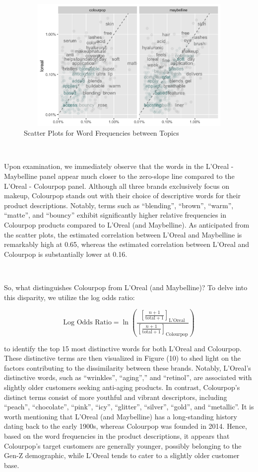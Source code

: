 \documentclass[10pt]{article}
\begin{document}
\begin{figure}[ht!]
    \centering
    \hspace*{-4em}
    \includegraphics[height=65mm, width=120mm]{corrplot2.png}
    \caption{Scatter Plots for Word Frequencies between Topics}
\end{figure}

\

Upon examination, we immediately observe that the words in the L'Oreal - Maybelline panel appear much closer to the zero-slope line compared to the L'Oreal - Colourpop panel. Although all three brands exclusively focus on makeup, Colourpop stands out with their choice of descriptive words for their product descriptions. Notably, terms such as ``blending'', ``brown'', ``warm'', ``matte'', and ``bouncy'' exhibit significantly higher relative frequencies in Colourpop products compared to L'Oreal (and Maybelline). As anticipated from the scatter plots, the estimated correlation between L'Oreal and Maybelline is remarkably high at 0.65, whereas the estimated correlation between L'Oreal and Colourpop is substantially lower at 0.16.

\

So, what distinguishes Colourpop from L'Oreal (and Maybelline)? To delve into this disparity, we utilize the log odds ratio:

$$\text{Log Odds Ratio} = \ln \left( \frac{\left[ \frac{n+1}{\text{total}+1} \right]_{\text{L'Oreal}}}{\left[ \frac{n+1}{\text{total}+1} \right]_{\text{Colourpop}}} \right)$$

to identify the top 15 most distinctive words for both L'Oreal and Colourpop. These distinctive terms are then visualized in Figure (10) to shed light on the factors contributing to the dissimilarity between these brands. Notably, L'Oreal's distinctive words, such as ``wrinkles'', ``aging'','' and ``retinol'', are associated with slightly older customers seeking anti-aging products. In contrast, Colourpop's distinct terms consist of more youthful and vibrant descriptors, including ``peach'', ``chocolate'', ``pink'', ``icy'', ``glitter'', ``silver'', ``gold'', and ``metallic''. It is worth mentioning that L'Oreal (and Maybelline) has a long-standing history dating back to the early 1900s, whereas Colourpop was founded in 2014. Hence, based on the word frequencies in the product descriptions, it appears that Colourpop's target customers are generally younger, possibly belonging to the Gen-Z demographic, while L'Oreal tends to cater to a slightly older customer base.
\end{document}
